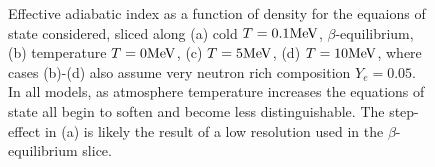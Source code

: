 \begin{figure}[]
	\centering
	\footnotesize{	
		
	}
	\caption[Adiabatic index vs. density for constant $Y_e = 0.3$, varying temperature]
	{
		Effective adiabatic index as a function of density for the equaions of state considered, sliced along 
		(a) cold $T=0.1 {\rm MeV}$, $\beta$-equilibrium,
		(b) temperature $T=0 {\rm MeV}$,
		(c) $T=5{\rm MeV}$,
		(d) $T=10{\rm MeV}$,
		where cases (b)-(d) also assume very neutron rich composition $Y_e = 0.05$.  In all models, as atmosphere temperature increases the equations of state all begin to soften and become less distinguishable.  
		The step-effect in (a) is likely the result of a low resolution used in the $\beta$-equilibrium slice. 
	}
	\label{fig:MultGammavsRho}
\end{figure}
